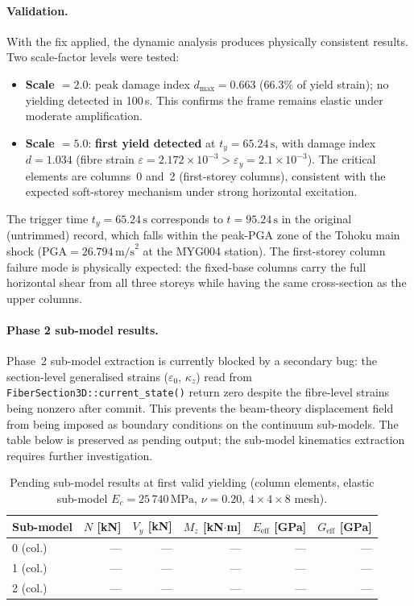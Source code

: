 \paragraph{Validation.}
With the fix applied, the dynamic analysis produces physically consistent
results.  Two scale-factor levels were tested:

\begin{itemize}
  \item \textbf{Scale $= 2.0$}: peak damage index $d_{\max} = 0.663$
        (66.3\% of yield strain); no yielding detected in 100\,s.
        This confirms the frame remains elastic under moderate
        amplification.
  \item \textbf{Scale $= 5.0$}: \textbf{first yield detected} at
        $t_y = 65.24\,\text{s}$, with damage index $d = 1.034$
        (fibre strain $\varepsilon = 2.172 \times 10^{-3} >
        \varepsilon_y = 2.1 \times 10^{-3}$).  The critical elements
        are columns~0 and~2 (first-storey columns), consistent with the
        expected soft-storey mechanism under strong horizontal excitation.
\end{itemize}

The trigger time $t_y = 65.24\,\text{s}$ corresponds to $t = 95.24\,\text{s}$
in the original (untrimmed) record, which falls within the peak-PGA zone
of the Tohoku main shock ($\text{PGA} = 26.794\,\text{m/s}^2$ at the
MYG004 station).  The first-storey column failure mode is physically
expected: the fixed-base columns carry the full horizontal shear from
all three storeys while having the same cross-section as the upper
columns.

\paragraph{Phase 2 sub-model results.}

Phase~2 sub-model extraction is currently blocked by a secondary bug:
the section-level generalised strains ($\varepsilon_0$, $\kappa_z$)
read from \texttt{FiberSection3D::current\_state()} return zero despite
the fibre-level strains being nonzero after commit.  This prevents the
beam-theory displacement field from being imposed as boundary conditions
on the continuum sub-models.  The table below is preserved as pending
output; the sub-model kinematics extraction requires further
investigation.

\begin{table}[htb]
\centering
\caption{Pending sub-model results at first valid yielding (column elements,
     elastic sub-model $E_c = 25\,740\,\text{MPa}$,
     $\nu = 0.20$, $4\times4\times8$ mesh).}
\label{tab:seismic_submodel_results}
\begin{tabular}{lrrrrr}
\hline
Sub-model & $N$ [kN] & $V_y$ [kN] & $M_z$ [kN$\cdot$m]
          & $E_\text{eff}$ [GPa] & $G_\text{eff}$ [GPa] \\
\hline
0 (col.) & --- & --- & --- & --- & --- \\
1 (col.) & --- & --- & --- & --- & --- \\
2 (col.) & --- & --- & --- & --- & --- \\
\hline
\end{tabular}
\end{table}

